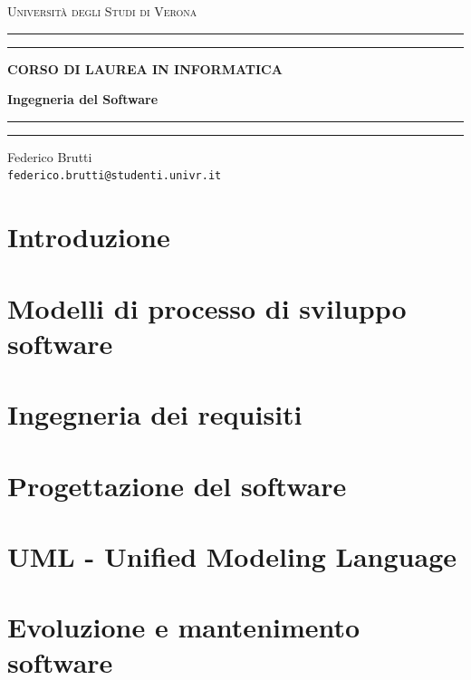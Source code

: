 \documentclass[12pt,a4paper,oneside]{book}
\begin{document}
	
	\begin{titlepage}
		\begin{center}
			{{\LARGE{\textsc{Università degli Studi di Verona}}}} \rule[0.1cm]{15.8cm}{0.1mm}
			\rule[0.5cm]{15.8cm}{0.6mm}
			{\small{\bf CORSO DI LAUREA IN INFORMATICA}}
		\end{center}
		\vspace{12.5mm}
		
		\begin{center}
			{\Huge{\bf Ingegneria del Software}}
		\end{center}
		\vspace{130mm}
		
		\begin{minipage}[l]{1.8mm}
			\rule[0.1cm]{0.1mm}{2cm}
			\rule[0.1cm]{0.6mm}{2cm}
		\end{minipage}
		\hspace{2mm}
		\begin{minipage}{10cm}	
			{\large{Federico Brutti\\
			\texttt{federico.brutti@studenti.univr.it}}}
		\end{minipage}
	\end{titlepage}
	
	\blankpage
	\tableofcontents
	
	\chapter*{Introduzione}
	
	\chapter{Modelli di processo di sviluppo software}
	
	\chapter{Ingegneria dei requisiti}
	
	\chapter{Progettazione del software}
	
	\chapter{UML - Unified Modeling Language}
	
	\chapter{Evoluzione e mantenimento software}
	
\end{document}
